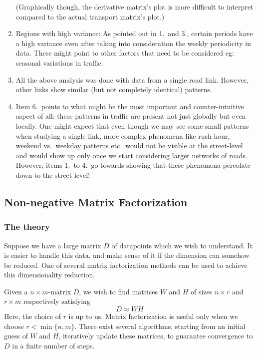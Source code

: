 \documentclass[10pt,a4paper]{amsart}
\begin{document}
\begin{enumerate}
    		(Graphically though, the derivative matrix's plot is more difficult
    		to interpret compared to the actual transport matrix's plot.)
    	\item Regions with high variance: As pointed out in 1.\ and 3., certain
    		periods have a high variance even after taking into consideration
    		the weekly periodicity in data. These might point to other factors
    		that need to be considered eg: seasonal variations in traffic.
    	\item All the above analysis was done with data from a single road link.
    		However, other links show similar (but not completely identical)
    		patterns.
    	\item Item 6.\ points to what might be the most important and
    		counter-intuitive aspect of all: these patterns in traffic are
    		present not just globally but even locally. One might expect that
    		even though we may see some small patterns when studying a single
    		link, more complex phenomena like rush-hour, weekend vs.\ weekday
    		patterns etc.\ would not be visible at the street-level and would
    		show up only once we start considering larger networks of roads.
    		However, items 1.\ to 4.\ go towards showing that these phenomena
    		percolate down to the street level!
\end{enumerate}

\subsection{Non-negative Matrix Factorization}
\subsubsection{The theory}
Suppose we have a large matrix \(D\) of datapoints which we wish to
understand. It is easier to handle this data, and make sense of it if the
dimension can somehow be reduced. One of several matrix factorization methods
can be used to achieve this dimensionality reduction.

Given a \(n\times m\)-matrix \(D\), we wish to find matrices \(W\) and \(H\)
of sizes \(n\times r\) and \(r\times m\) respectively satisfying
	\[D\approx WH\]
Here, the choice of \(r\) is up to us. Matrix factorization is useful only
when we choose \(r<\min\{n,m\}\). There exist several algorithms, starting
from an initial guess of \(W\) and \(H\), iteratively update these matrices,
to guarantee convergence to \(D\) in a finite number of steps. 
\end{document}
